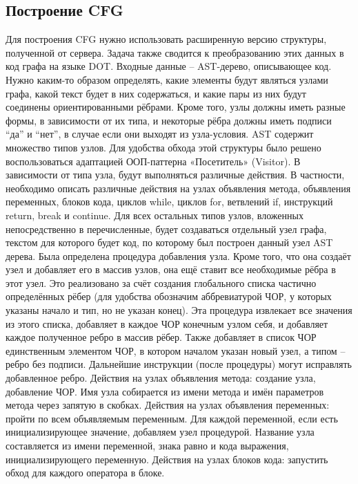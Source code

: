 \subsection{Построение CFG} \label{ch2:subsec-title-abbr}
Для построения CFG нужно использовать расширенную версию структуры, полученной от сервера. Задача также сводится к преобразованию этих данных в код графа на языке DOT.
Входные данные – AST-дерево, описывающее код. Нужно каким-то образом определять, какие элементы будут являться узлами графа, какой текст будет в них содержаться, и какие пары из них будут соединены ориентированными рёбрами. Кроме того, узлы должны иметь разные формы, в зависимости от их типа, и некоторые рёбра должны иметь подписи “да” и “нет”, в случае если они выходят из узла-условия.
AST содержит множество типов узлов. Для удобства обхода этой структуры было решено воспользоваться адаптацией ООП-паттерна «Посетитель» (Visitor). В зависимости от типа узла, будут выполняться различные действия. В частности, необходимо описать различные действия на узлах объявления метода, объявления переменных, блоков кода, циклов while, циклов for, ветвлений if, инструкций return, break и continue. Для всех остальных типов узлов, вложенных непосредственно в перечисленные, будет создаваться отдельный узел графа, текстом для которого будет код, по которому был построен данный узел AST дерева.
Была определена процедура добавления узла. Кроме того, что она создаёт узел и добавляет его в массив узлов, она ещё ставит все необходимые рёбра в этот узел. Это реализовано за счёт создания глобального списка частично определённых рёбер (для удобства обозначим аббревиатурой ЧОР, у которых указаны начало и тип, но не указан конец). Эта процедура извлекает все значения из этого списка, добавляет в каждое ЧОР конечным узлом себя, и добавляет каждое полученное ребро в массив рёбер. Также добавляет в список ЧОР единственным элементом ЧОР, в котором началом указан новый узел, а типом – ребро без подписи. Дальнейшие инструкции (после процедуры) могут исправлять добавленное ребро.
Действия на узлах объявления метода: создание узла, добавление ЧОР. Имя узла собирается из имени метода и имён параметров метода через запятую в скобках.
Действия на узлах объявления переменных: пройти по всем объявляемым переменным. Для каждой переменной, если есть инициализирующее значение, добавляем узел процедурой. Название узла составляется из имени переменной, знака равно и кода выражения, инициализирующего переменную.
Действия на узлах блоков кода: запустить обход для каждого оператора в блоке.
